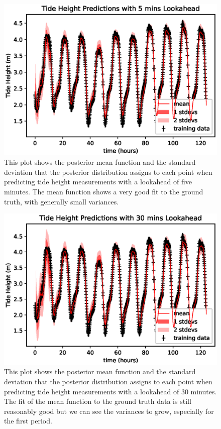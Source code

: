 \documentclass{article}
\begin{document}
                \begin{figure}[h!]
                    \includegraphics[width=\linewidth,height=\textheight,keepaspectratio]{tide_height_lookahead_5mins.eps}
                    \caption{This plot shows the posterior mean function and the standard deviation that the posterior distribution assigns to each point when predicting tide height measurements with a lookahead of five minutes. The mean function shows a very good fit to the ground truth, with generally small variances.}
                    \label{plot_tideheightlookahead_5mins}
                \end{figure}

                \begin{figure}[h!]
                    \includegraphics[width=\linewidth,height=\textheight,keepaspectratio]{tide_height_lookahead_30mins.eps}
                    \caption{This plot shows the posterior mean function and the standard deviation that the posterior distribution assigns to each point when predicting tide height measurements with a lookahead of 30 minutes. The fit of the mean function to the ground truth data is still reasonably good but we can see the variances to grow, especially for the first period.}
                    \label{plot_tideheightlookahead_30mins}
                \end{figure}
\end{document}
